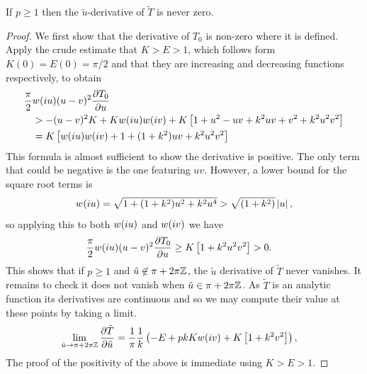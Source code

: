 \documentclass{article}
\begin{document}
\begin{lem}\label{lem:dTdu_nonzero}
If $p \geq 1$ then the $\tilde{u}$-derivative of $\tilde{T}$ is never zero.

\begin{proof}
We first show that the derivative of $T_0$ is non-zero where it is defined. Apply the crude estimate that $K>E>1$,
which follows form $K(0)=E(0)=\pi/2$ and that they are increasing and decreasing functions respectively, to obtain
\begin{align*}
\frac{\pi}{2}&w(i u)(u-v)^2\frac{\partial T_0}{\partial u}\\
&> -(u-v)^2 K + Kw(i u)w(i v) + K\left[ 1 + u^2 - uv + k^2 uv + v^2 + k^2 u^2 v^2 \right] \\
&= K \left[ w(i u)w(i v) + 1 + (1 + k^2) uv + k^2 u^2 v^2 \right]
\end{align*}
This formula is almost sufficient to show the derivative is positive. The only term that could be negative is the one featuring $uv$. However, a lower bound for the square root terms is
\[
w(i u) = \sqrt{1 + (1+k^2)u^2 + k^2u^4} > \sqrt{(1+k^2)}\left|u\right|,
\]
so applying this to both $w(i u)$ and $w(i v)$ we have
\begin{align*}
\frac{\pi}{2}w(i u)(u-v)^2\frac{\partial T_0}{\partial u}
&\geq K \left[ 1 + k^2 u^2 v^2 \right] >0.
\end{align*}
This shows that if $p\geq 1$ and $\tilde{u} \not\in \pi + 2\pi\mathbb{Z}$, the $\tilde{u}$ derivative of $\tilde{T}$ never vanishes. It remains to check it does not vanish when $\tilde{u} \in \pi + 2\pi\mathbb{Z}$. As $\tilde{T}$ is an analytic function its derivatives are continuous and so we may compute their value at these points by taking a limit.
\begin{align*}
\lim_{\tilde{u}\to \pi + 2\pi\mathbb{Z}} \frac{\partial \tilde{T}}{\partial \tilde{u}}
&=\frac{1}{\pi} \frac{1}{k} \left(-E + pkKw(i v) + K\left[ 1 + k^2v^2 \right]\right),
\end{align*}
The proof of the positivity of the above is immediate using $K>E>1$.
\end{proof}
\end{lem}
\end{document}

